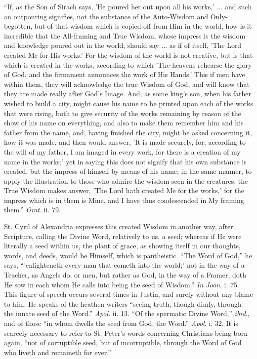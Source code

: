 ``If, as the Son of Sirach says, 'He poured her out upon all
his works,' ... and such an outpouring signifies, not the substance of
the Auto-Wisdom and Only-begotten, but of that wisdom which is copied
off from Him in the world, how is it incredible that the All-framing
and True Wisdom, whose impress is the wisdom and knowledge poured out
in the world, should say ... as if of itself, 'The Lord created Me for
His works.' For the wisdom of the world is not creative, but is that
which is created in the works, according to which 'The heavens
rehearse the glory of God, and the firmament announces the work of His
Hands.' This if men have within them, they will acknowledge the true
Wisdom of God, and will know that they are made really after God's
Image. And, as some king's son, when his father wished to build a
city, might cause his name to be printed upon each of the works that
were rising, both to give security of the works remaining by reason of
the show of his name on everything, and also to make them remember him
and his father from the name, and, having finished the city, might be
asked concerning it, how it was made, and then would answer, 'It is
made securely, for, according to the will of my father, I am imaged in
every work, for there is a creation of my name in the works;'
yet in saying this does not signify that his own substance is created,
but the impress of himself by means of his name; in the same manner,
to apply the illustration to those who admire the wisdom seen in the
creatures, the True Wisdom makes answer, 'The Lord hath created Me for
the works,' for the impress which is in them is Mine, and I have thus
condescended in My framing them.'' \emph{Orat}. ii. 79.

St. Cyril of Alexandria expresses this created Wisdom in another
way, after Scripture, calling the Divine Word, relatively to us, a
seed; whereas if He were literally a seed within us, the plant of
grace, as showing itself in our thoughts, words, and deeds, would be
Himself, which is pantheistic. ``The Word of God,'' he says,
``'enlighteneth every man that cometh into the world;' not in the
way of a Teacher, as Angels do, or men, but rather as God, in the way
of a Framer, doth He sow in each whom He calls into being the seed of
Wisdom.'' \emph{In Joan}. i. 75. This figure of speech occurs
several times in Justin, and surely without any blame to him. He
speaks of the heathen writers ``seeing truth, though dimly,
through the innate seed of the Word.'' \emph{Apol}. ii. 13.
``Of the spermatic Divine Word,'' \emph{ibid}., and of those
``in whom dwells the seed from God, the Word.'' \emph{Apol}. i.
32. It is scarcely necessary to refer to St. Peter's words concerning
Christians being born again, ``not of corruptible seed, but of
incorruptible, through the Word of God who liveth and remaineth for
ever.''


